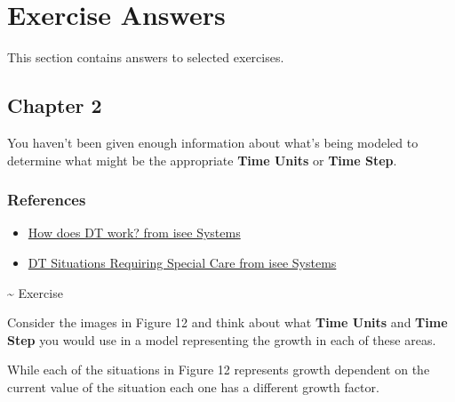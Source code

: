 \documentclass[]{memoir}
\renewcommand{\u}[1]{\textbf{#1}}
\begin{document}
\chapter{Exercise Answers}

This section contains answers to selected exercises.

\section{Chapter 2}


You haven't been given enough information about what's being modeled to
determine what might be the appropriate \u{Time Units} or \u{Time Step}.

\subsection{References}

\begin{itemize}
\itemsep1pt\parskip0pt
\item
  \href{http://www.iseesystems.com/Helpv9/Content/DT/How_does_DT_work_.htm}{How
  does DT work? from isee Systems}
\item
  \href{http://www.iseesystems.com/Helpv9/Content/DT/DT_Special_Care.htm}{DT
  Situations Requiring Special Care from isee Systems}
\end{itemize}

\textasciitilde{} Exercise

Consider the images in Figure 12 and think about what \u{Time Units} and
\u{Time Step} you would use in a model representing the growth in each
of these areas.


While each of the situations in Figure 12 represents growth dependent on
the current value of the situation each one has a different growth
factor.

\end{document}
